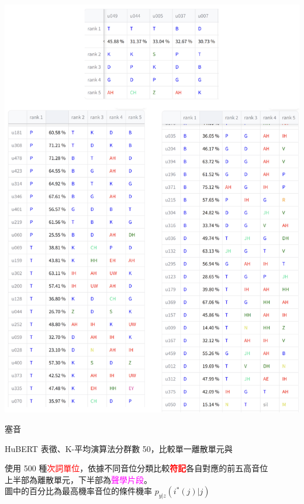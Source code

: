 {    {
        \begin{table}
            \centering
            \begin{subtable}{\textwidth}
                \centering
                \includegraphics[width=0.8\linewidth]{figures/ch4figs/plo_phn.png}
                \caption{塞音}
                \label{subtabfig:hub-u050-ap0500-ploobs}
            \end{subtable}

            \caption{HuBERT 表徵、K-平均演算法分群數 50，比較單一離散單元與}
            使用 500 種\textcolor{red}{次詞單位}，依據不同音位分類比較\textbf{\textcolor{red}{符記}}各自對應的前五高音位 \\
            上半部為離散單元，下半部為\textcolor{magenta}{聲學片段}。 \\
            圖中的百分比為最高機率音位的條件機率 $p_{y|z}(i^*(j)|j)$
            \label{tabfig:hub-u050-phnobserver}
        \end{table}

}}
